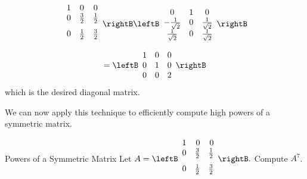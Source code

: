 \begin{solution}
\begin{equation*}
\begin{array}{ccc}
1 & 0 & 0 \\ 
0 & \vspace{0.05in}\frac{3}{2} & \vspace{0.05in}\frac{1}{2} \\ 
0 & \vspace{0.05in}\frac{1}{2} & \vspace{0.05in}\frac{3}{2}
\end{array}
\rightB \leftB 
\begin{array}{ccc}
0 & 1 & 0 \\ 
-\frac{1}{\sqrt{2}} & 0 & \frac{1}{\sqrt{2}} \\ 
\frac{1}{\sqrt{2}} & 0 & \frac{1}{\sqrt{2}}
\end{array}
\rightB
\end{equation*}
\begin{equation*}
=\allowbreak \leftB 
\begin{array}{ccc}
1 & 0 & 0 \\ 
0 & 1 & 0 \\ 
0 & 0 & 2
\end{array}
\rightB 
\end{equation*}
which is the desired diagonal matrix.
\end{solution}

We can now apply this technique to efficiently compute high powers of a symmetric matrix. 

\begin{example}{Powers of a Symmetric Matrix}\label{exa:powerssymmetricmatrix}
Let $A=\leftB
\begin{array}{rrr}
1 & 0 & 0 \\
0 & \vspace{0.05in}\frac{3}{2} & \vspace{0.05in}\frac{1}{2} \\
0 & \vspace{0.05in}\frac{1}{2} & \vspace{0.05in}\frac{3}{2}
\end{array}
\rightB .$ 
Compute $A^7$. 
\end{example}

